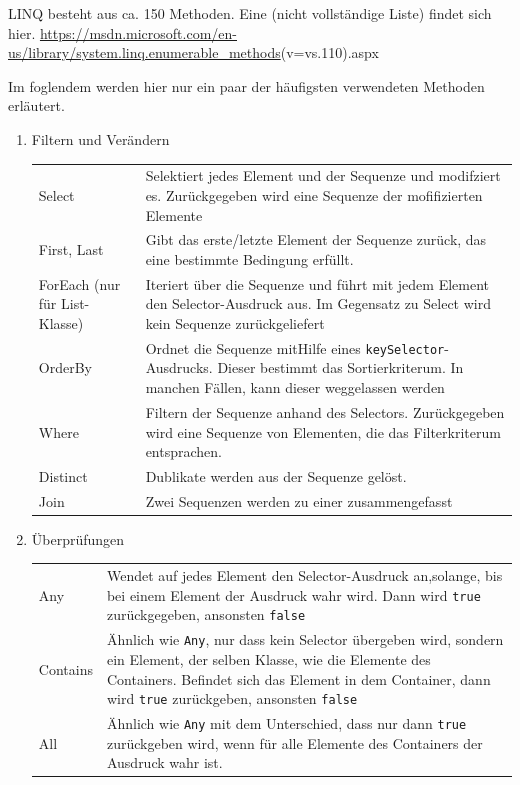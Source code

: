\documentclass[11pt]{article}
\begin{document}
LINQ besteht aus ca. 150 Methoden.
Eine (nicht vollständige Liste) findet sich hier.
\url{https://msdn.microsoft.com/en-us/library/system.linq.enumerable_methods}(v=vs.110).aspx

Im foglendem werden hier nur ein paar der häufigsten verwendeten Methoden erläutert.

\begin{enumerate}
\item Filtern und Verändern
\label{sec:orgheadline36}
\begin{center}
\begin{tabular}{ll}
Select & Selektiert jedes Element und der Sequenze und modifziert es. Zurückgegeben wird eine Sequenze der mofifizierten Elemente\\
First,  Last & Gibt das erste/letzte Element der Sequenze zurück, das eine bestimmte Bedingung erfüllt.\\
ForEach (nur für List-Klasse) & Iteriert über die Sequenze und führt mit jedem Element den Selector-Ausdruck aus. Im Gegensatz zu Select wird kein Sequenze zurückgeliefert\\
OrderBy & Ordnet die Sequenze mitHilfe eines \texttt{keySelector}-Ausdrucks. Dieser bestimmt das Sortierkriterum. In manchen Fällen, kann dieser weggelassen werden\\
Where & Filtern der Sequenze anhand des Selectors. Zurückgegeben wird eine Sequenze von Elementen, die das Filterkriterum entsprachen.\\
Distinct & Dublikate werden aus der Sequenze gelöst.\\
Join & Zwei Sequenzen werden zu einer zusammengefasst\\
\end{tabular}
\end{center}
\item Überprüfungen
\label{sec:orgheadline37}
\begin{center}
\begin{tabular}{ll}
Any & Wendet auf jedes Element den Selector-Ausdruck an,solange, bis bei einem Element der Ausdruck wahr wird. Dann wird \texttt{true} zurückgegeben, ansonsten \texttt{false}\\
Contains & Ähnlich wie \texttt{Any}, nur dass kein Selector übergeben wird, sondern ein Element, der selben Klasse, wie die Elemente des Containers. Befindet sich das Element in dem Container, dann wird \texttt{true} zurückgeben, ansonsten \texttt{false}\\
All & Ähnlich wie \texttt{Any} mit dem Unterschied, dass nur dann \texttt{true} zurückgeben wird, wenn für alle Elemente des Containers der Ausdruck wahr ist.\\

\end{tabular}
\end{center}
\end{enumerate}
\end{document}
